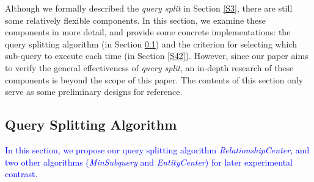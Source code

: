 Although we formally described the \textit{query split} in Section \ref{S3}, there are still some relatively flexible components. In this section, we examine these components in more detail, and provide some concrete implementations: the query splitting algorithm (in Section \ref{S41}) and the criterion for selecting which sub-query to execute each time (in Section \ref{S42}). However, since our paper aims to verify the general effectiveness of \textit{query split}, an in-depth research of these components is beyond the scope of this paper. The contents of this section only serve as some preliminary designs for reference.
\subsection{Query Splitting Algorithm} \label{S41}
\textcolor{blue}{
    In this section, we propose our query splitting algorithm \textit{RelationshipCenter}, and two other algorithms (\textit{MinSubquery} and \textit{EntityCenter}) for later experimental contrast.
}
